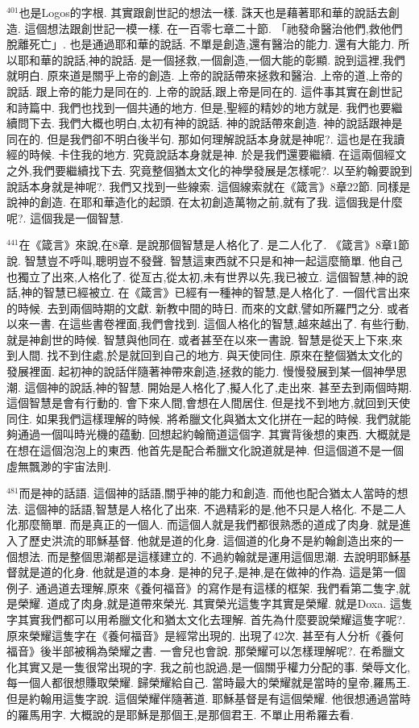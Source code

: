 \documentclass{book}
\begin{document}
$^{401}$也是Logos的字根.
其實跟創世記的想法一樣.
誅天也是藉著耶和華的說話去創造.
這個想法跟創世記一模一樣.
在一百零七章二十節.
「祂發命醫治他們,救他們脫離死亡」.
也是通過耶和華的說話.
不單是創造,還有醫治的能力.
還有大能力.
所以耶和華的說話,神的說話.
是一個拯救,一個創造,一個大能的彰顯.
說到這裡,我們就明白.
原來道是關乎上帝的創造.
上帝的說話帶來拯救和醫治.
上帝的道,上帝的說話.
跟上帝的能力是同在的.
上帝的說話,跟上帝是同在的.
這件事其實在創世記和詩篇中.
我們也找到一個共通的地方.
但是,聖經的精妙的地方就是.
我們也要繼續問下去.
我們大概也明白,太初有神的說話.
神的說話帶來創造.
神的說話跟神是同在的.
但是我們卻不明白後半句.
那如何理解說話本身就是神呢?.
這也是在我讀經的時候.
卡住我的地方.
究竟說話本身就是神.
於是我們還要繼續.
在這兩個經文之外,我們要繼續找下去.
究竟整個猶太文化的神學發展是怎樣呢?.
以至約翰要說到說話本身就是神呢?.
我們又找到一些線索.
這個線索就在《箴言》8章22節.
同樣是說神的創造.
在耶和華造化的起頭.
在太初創造萬物之前,就有了我.
這個我是什麼呢?.
這個我是一個智慧.

$^{441}$在《箴言》來說,在8章.
是說那個智慧是人格化了.
是二人化了.
《箴言》8章1節說.
智慧豈不呼叫,聰明豈不發聲.
智慧這東西就不只是和神一起這麼簡單.
他自己也獨立了出來,人格化了.
從亙古,從太初,未有世界以先,我已被立.
這個智慧,神的說話,神的智慧已經被立.
在《箴言》已經有一種神的智慧,是人格化了.
一個代言出來的時候.
去到兩個時期的文獻.
新教中間的時日.
而來的文獻,譬如所羅門之分.
或者以來一書.
在這些書卷裡面,我們會找到.
這個人格化的智慧,越來越出了.
有些行動,就是神創世的時候.
智慧與他同在.
或者甚至在以來一書說.
智慧是從天上下來,來到人間.
找不到住處,於是就回到自己的地方.
與天使同住.
原來在整個猶太文化的發展裡面.
起初神的說話伴隨著神帶來創造,拯救的能力.
慢慢發展到某一個神學思潮.
這個神的說話,神的智慧.
開始是人格化了,擬人化了,走出來.
甚至去到兩個時期.
這個智慧是會有行動的.
會下來人間,會想在人間居住.
但是找不到地方,就回到天使同住.
如果我們這樣理解的時候.
將希臘文化與猶太文化拼在一起的時候.
我們就能夠通過一個叫時光機的蕴動.
回想起約翰簡道這個字.
其實背後想的東西.
大概就是在想在這個泡泡上的東西.
他首先是配合希臘文化說道就是神.
但這個道不是一個虛無飄渺的宇宙法則.

$^{481}$而是神的話語.
這個神的話語,關乎神的能力和創造.
而他也配合猶太人當時的想法.
這個神的話語,智慧是人格化了出來.
不過精彩的是,他不只是人格化.
不是二人化那麼簡單.
而是真正的一個人.
而這個人就是我們都很熟悉的道成了肉身.
就是進入了歷史洪流的耶穌基督.
他就是道的化身.
這個道的化身不是約翰創造出來的一個想法.
而是整個思潮都是這樣建立的.
不過約翰就是運用這個思潮.
去說明耶穌基督就是道的化身.
他就是道的本身.
是神的兒子,是神,是在做神的作為.
這是第一個例子.
通過道去理解,原來《養何福音》的寫作是有這樣的框架.
我們看第二隻字,就是榮耀.
道成了肉身,就是道帶來榮光.
其實榮光這隻字其實是榮耀.
就是Doxa.
這隻字其實我們都可以用希臘文化和猶太文化去理解.
首先為什麼要說榮耀這隻字呢?.
原來榮耀這隻字在《養何福音》是經常出現的.
出現了42次.
甚至有人分析《養何福音》後半部被稱為榮耀之書.
一會兒也會說.
那榮耀可以怎樣理解呢?.
在希臘文化其實又是一隻很常出現的字.
我之前也說過,是一個關乎權力分配的事.
榮辱文化,每一個人都很想賺取榮耀.
歸榮耀給自己.
當時最大的榮耀就是當時的皇帝,羅馬王.
但是約翰用這隻字說.
這個榮耀伴隨著道.
耶穌基督是有這個榮耀.
他很想通過當時的羅馬用字.
大概說的是耶穌是那個王,是那個君王.
不單止用希羅去看.
\end{document}

